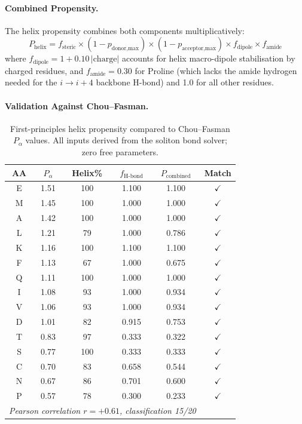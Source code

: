\paragraph{Combined Propensity.}
The helix propensity combines both components multiplicatively:
\begin{equation}
    P_\text{helix} = f_\text{steric} \times (1 - p_\text{donor,max}) \times (1 - p_\text{acceptor,max}) \times f_\text{dipole} \times f_\text{amide}
    \label{eq:p_helix_combined}
\end{equation}
where $f_\text{dipole} = 1 + 0.10 \,|\text{charge}|$ accounts for helix macro-dipole stabilisation by charged residues, and $f_\text{amide} = 0.30$ for Proline (which lacks the amide hydrogen needed for the $i \to i{+}4$ backbone H-bond) and 1.0 for all other residues.

\paragraph{Validation Against Chou--Fasman.}

\begin{table}[H]
\centering
\caption{First-principles helix propensity compared to Chou--Fasman $P_\alpha$ values.  All inputs derived from the soliton bond solver; zero free parameters.}
\label{tab:ramachandran_validation}
\small
\begin{tabular}{c c c c c c}
\toprule
AA & $P_\alpha$ & Helix\% & $f_\text{H-bond}$ & $P_\text{combined}$ & Match \\
\midrule
    E & 1.51 & 100 & 1.100 & 1.100 & $\checkmark$ \\
    M & 1.45 & 100 & 1.000 & 1.000 & $\checkmark$ \\
    A & 1.42 & 100 & 1.000 & 1.000 & $\checkmark$ \\
    L & 1.21 & 79 & 1.000 & 0.786 & $\checkmark$ \\
    K & 1.16 & 100 & 1.100 & 1.100 & $\checkmark$ \\
    F & 1.13 & 67 & 1.000 & 0.675 & $\checkmark$ \\
    Q & 1.11 & 100 & 1.000 & 1.000 & $\checkmark$ \\
    I & 1.08 & 93 & 1.000 & 0.934 & $\checkmark$ \\
    V & 1.06 & 93 & 1.000 & 0.934 & $\checkmark$ \\
    D & 1.01 & 82 & 0.915 & 0.753 & $\checkmark$ \\
    T & 0.83 & 97 & 0.333 & 0.322 & $\checkmark$ \\
    S & 0.77 & 100 & 0.333 & 0.333 & $\checkmark$ \\
    C & 0.70 & 83 & 0.658 & 0.544 & $\checkmark$ \\
    N & 0.67 & 86 & 0.701 & 0.600 & $\checkmark$ \\
    P & 0.57 & 78 & 0.300 & 0.233 & $\checkmark$ \\
\midrule
    \multicolumn{5}{l}{\textit{Pearson correlation $r = +0.61$, classification 15/20}} \\
\bottomrule
\end{tabular}
\end{table}

